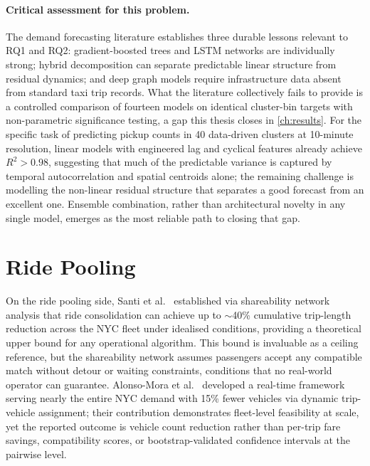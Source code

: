 \paragraph{Critical assessment for this problem.} The demand forecasting literature establishes three durable lessons relevant to RQ1 and RQ2: gradient-boosted trees and LSTM networks are individually strong; hybrid decomposition can separate predictable linear structure from residual dynamics; and deep graph models require infrastructure data absent from standard taxi trip records. What the literature collectively fails to provide is a controlled comparison of fourteen models on identical cluster-bin targets with non-parametric significance testing, a gap this thesis closes in \autoref{ch:results}. For the specific task of predicting pickup counts in 40 data-driven clusters at 10-minute resolution, linear models with engineered lag and cyclical features already achieve $R^2 > 0.98$, suggesting that much of the predictable variance is captured by temporal autocorrelation and spatial centroids alone; the remaining challenge is modelling the non-linear residual structure that separates a good forecast from an excellent one. Ensemble combination, rather than architectural novelty in any single model, emerges as the most reliable path to closing that gap.

\section{Ride Pooling}

On the ride pooling side, Santi et al.~\parencite{santi2014quantifying} established via shareability network analysis that ride consolidation can achieve up to $\sim$40\% cumulative trip-length reduction across the NYC fleet under idealised conditions, providing a theoretical upper bound for any operational algorithm. This bound is invaluable as a ceiling reference, but the shareability network assumes passengers accept any compatible match without detour or waiting constraints, conditions that no real-world operator can guarantee. Alonso-Mora et al.~\parencite{alonso2017demand} developed a real-time framework serving nearly the entire NYC demand with 15\% fewer vehicles via dynamic trip-vehicle assignment; their contribution demonstrates fleet-level feasibility at scale, yet the reported outcome is vehicle count reduction rather than per-trip fare savings, compatibility scores, or bootstrap-validated confidence intervals at the pairwise level.

